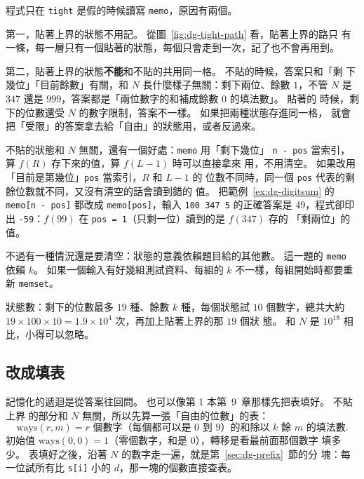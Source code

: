程式只在 \texttt{tight} 是假的時候讀寫 \texttt{memo}，原因有兩個。

第一，貼著上界的狀態不用記。 從圖~\ref{fig:dg-tight-path} 看，貼著上界的路只
有一條，每一層只有一個貼著的狀態，每個只會走到一次，記了也不會再用到。

第二，貼著上界的狀態\textbf{不能}和不貼的共用同一格。 不貼的時候，答案只和「剩
下幾位」「目前餘數」有關，和 $N$ 長什麼樣子無關：剩下兩位、餘數 $1$，不管 $N$
是 $347$ 還是 $999$，答案都是「兩位數字的和補成餘數 $0$ 的填法數」。 貼著的
時候，剩下的位數還受 $N$ 的數字限制，答案不一樣。 如果把兩種狀態存進同一格，
就會把「受限」的答案拿去給「自由」的狀態用，或者反過來。

不貼的狀態和 $N$ 無關，還有一個好處：\texttt{memo} 用「剩下幾位」
\texttt{n - pos} 當索引，算 $f(R)$ 存下來的值，算 $f(L - 1)$ 時可以直接拿來
用，不用清空。 如果改用「目前是第幾位」\texttt{pos} 當索引，$R$ 和 $L - 1$ 的
位數不同時，同一個 \texttt{pos} 代表的剩餘位數就不同，又沒有清空的話會讀到錯的
值。 把範例~\ref{ex:dg-digitsum} 的 \texttt{memo[n - pos]} 都改成
\texttt{memo[pos]}，輸入 \texttt{100 347 5} 的正確答案是 $49$，程式卻印出
\texttt{-59}：$f(99)$ 在 \texttt{pos = 1}（只剩一位）讀到的是 $f(347)$ 存的
「剩兩位」的值。

不過有一種情況還是要清空：狀態的意義依賴題目給的其他數。 這一題的 \texttt{memo}
依賴 $k$。 如果一個輸入有好幾組測試資料、每組的 $k$ 不一樣，每組開始時都要重新
\texttt{memset}。

狀態數：剩下的位數最多 $19$ 種、餘數 $k$ 種，每個狀態試 $10$ 個數字，總共大約
$19 \times 100 \times 10 = 1.9 \times 10^4$ 次，再加上貼著上界的那 $19$ 個狀
態。 和 $N$ 是 $10^{18}$ 相比，小得可以忽略。

\subsection{改成填表}
\label{sec:dg-table}

記憶化的遞迴是從答案往回問。 也可以像第 1 本第~9~章那樣先把表填好。 不貼上界
的部分和 $N$ 無關，所以先算一張「自由的位數」的表：
\[
\mathrm{ways}(r, m) = r \text{ 個數字（每個都可以是 } 0 \text{ 到 } 9 \text{）的和除以 } k \text{ 餘 } m \text{ 的填法數}.
\]
初始值 $\mathrm{ways}(0, 0) = 1$（零個數字，和是 $0$），轉移是看最前面那個數字
填多少。 表填好之後，沿著 $N$ 的數字走一遍，就是第~\ref{sec:dg-prefix}~節的分
塊：每一位試所有比 \texttt{s[i]} 小的 $d$，那一塊的個數直接查表。

